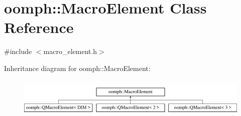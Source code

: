 \hypertarget{classoomph_1_1MacroElement}{}\section{oomph\+:\+:Macro\+Element Class Reference}
\label{classoomph_1_1MacroElement}


{\ttfamily \#include $<$macro\+\_\+element.\+h$>$}

Inheritance diagram for oomph\+:\+:Macro\+Element\+:\begin{figure}[H]
\begin{center}
\leavevmode
\includegraphics[height=1.857380cm]{classoomph_1_1MacroElement}
\end{center}
\end{figure}
